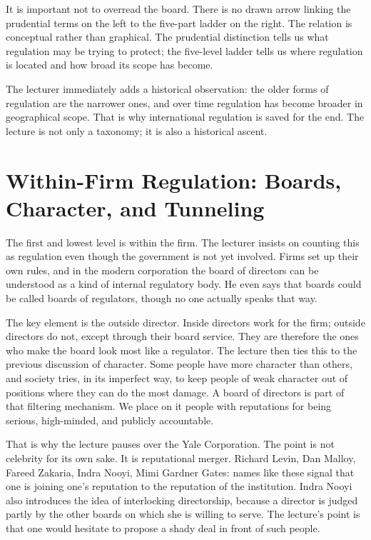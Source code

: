 It is important not to overread the board. There is no drawn arrow linking the prudential terms on the left to the five-part ladder on the right. The relation is conceptual rather than graphical. The prudential distinction tells us what regulation may be trying to protect; the five-level ladder tells us where regulation is located and how broad its scope has become.

The lecturer immediately adds a historical observation: the older forms of regulation are the narrower ones, and over time regulation has become broader in geographical scope. That is why international regulation is saved for the end. The lecture is not only a taxonomy; it is also a historical ascent.

\section{Within-Firm Regulation: Boards, Character, and Tunneling}

The first and lowest level is within the firm. The lecturer insists on counting this as regulation even though the government is not yet involved. Firms set up their own rules, and in the modern corporation the board of directors can be understood as a kind of internal regulatory body. He even says that boards could be called boards of regulators, though no one actually speaks that way.

The key element is the outside director. Inside directors work for the firm; outside directors do not, except through their board service. They are therefore the ones who make the board look most like a regulator. The lecture then ties this to the previous discussion of character. Some people have more character than others, and society tries, in its imperfect way, to keep people of weak character out of positions where they can do the most damage. A board of directors is part of that filtering mechanism. We place on it people with reputations for being serious, high-minded, and publicly accountable.

That is why the lecture pauses over the Yale Corporation. The point is not celebrity for its own sake. It is reputational merger. Richard Levin, Dan Malloy, Fareed Zakaria, Indra Nooyi, Mimi Gardner Gates: names like these signal that one is joining one's reputation to the reputation of the institution. Indra Nooyi also introduces the idea of interlocking directorship, because a director is judged partly by the other boards on which she is willing to serve. The lecture's point is that one would hesitate to propose a shady deal in front of such people.


